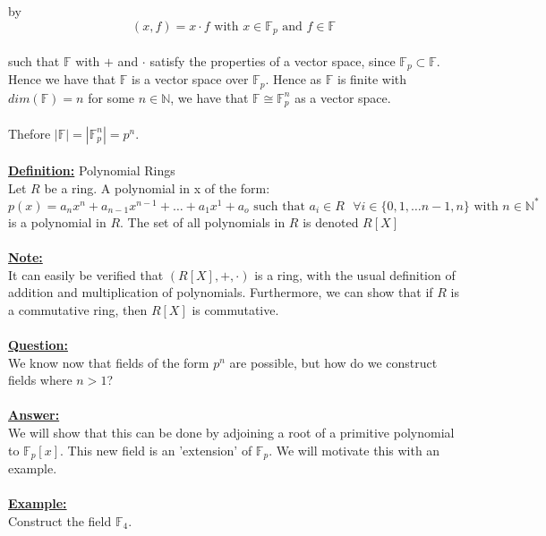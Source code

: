 \documentclass[11pt]{article}
\theoremstyle{plain}
\theoremstyle{definition}
\begin{document}
by \\
\begin{equation*}
(x, f) = x \cdot f \text{ with } x \in \mathbb{F}_p \text{ and } f \in \mathbb{F}
\end{equation*}
\\
such that $\mathbb{F}$ with $+$ and $\cdot$ satisfy the properties of a vector space, since $\mathbb{F}_p \subset \mathbb{F}$. Hence we have that $\mathbb{F}$ is a vector space over $\mathbb{F}_p$. Hence as $\mathbb{F}$ is finite with $dim(\mathbb{F})=n$ for some $n \in \mathbb{N}$, we have that $\mathbb{F} \cong \mathbb{F}_{p} ^{n}$ as a vector space.\\
\\
Thefore $|\mathbb{F}| = |\mathbb{F}_{p} ^{n}| = p^n$.\\
\\
\textbf{\underline{Definition:}} Polynomial Rings\\
Let $R$ be a ring. A polynomial in x of the form:
\begin{equation*}
p(x)=a_n x^n + a_{n-1} x^{n-1} + \ldots+ a_1 x^1 + a_o \text{ such that  } a_i \in R \text{ } \forall i \in \{0, 1, \ldots n-1, n\} \text{ with } n \in \mathbb{N}^*
\end{equation*}
is a polynomial in $R$. The set of all polynomials in $R$ is denoted $R[X]$\\
\\
\textbf{\underline{Note:}}\\
It can easily be verified that $(R[X], +, \cdot)$ is a ring, with the usual definition of addition and multiplication of polynomials. Furthermore, we can show that if $R$ is a commutative ring, then $R[X]$ is commutative.\\
\\
\textbf{\underline{Question:}}\\
We know now that fields of the form $p^n$ are possible, but how do we construct fields where $n >1$?\\
\\
\textbf{\underline{Answer:}}\\
We will show that this can be done by adjoining a root of a primitive polynomial to $\mathbb{F}_p [x]$. This new field is an 'extension' of $\mathbb{F}_p$. We will motivate this with an example. \\
\\	
\textbf{\underline{Example:}}\\
Construct the field $\mathbb{F}_4$.\\
\\
\end{document}
